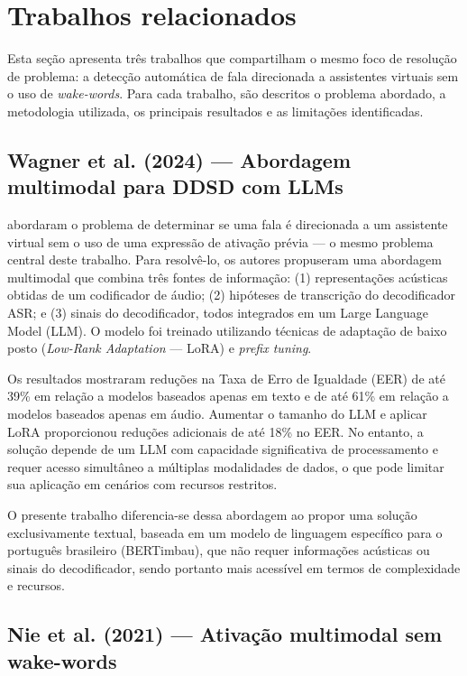 \documentclass[
    12pt,                %
    openright,           %
    oneside,             %
    a4paper,             %
    english,             %
    brazil               %
]{abntex2}
\begin{document}
\section{Trabalhos relacionados}
\label{sec:trabalhos_relacionados}

Esta seção apresenta três trabalhos que compartilham o mesmo foco de resolução de problema: a detecção automática de fala direcionada a assistentes virtuais sem o uso de \textit{wake-words}. Para cada trabalho, são descritos o problema abordado, a metodologia utilizada, os principais resultados e as limitações identificadas.

\subsection{Wagner et al. (2024) --- Abordagem multimodal para DDSD com LLMs}

 abordaram o problema de determinar se uma fala é direcionada a um assistente virtual sem o uso de uma expressão de ativação prévia --- o mesmo problema central deste trabalho. Para resolvê-lo, os autores propuseram uma abordagem multimodal que combina três fontes de informação: (1) representações acústicas obtidas de um codificador de áudio; (2) hipóteses de transcrição do decodificador ASR; e (3) sinais do decodificador, todos integrados em um Large Language Model (LLM). O modelo foi treinado utilizando técnicas de adaptação de baixo posto (\textit{Low-Rank Adaptation} --- LoRA) e \textit{prefix tuning}.

Os resultados mostraram reduções na Taxa de Erro de Igualdade (EER) de até 39\% em relação a modelos baseados apenas em texto e de até 61\% em relação a modelos baseados apenas em áudio. Aumentar o tamanho do LLM e aplicar LoRA proporcionou reduções adicionais de até 18\% no EER. No entanto, a solução depende de um LLM com capacidade significativa de processamento e requer acesso simultâneo a múltiplas modalidades de dados, o que pode limitar sua aplicação em cenários com recursos restritos.

O presente trabalho diferencia-se dessa abordagem ao propor uma solução exclusivamente textual, baseada em um modelo de linguagem específico para o português brasileiro (BERTimbau), que não requer informações acústicas ou sinais do decodificador, sendo portanto mais acessível em termos de complexidade e recursos.

\subsection{Nie et al. (2021) --- Ativação multimodal sem wake-words}
\end{document}
